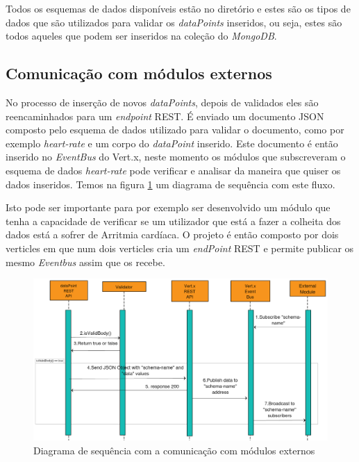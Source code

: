 Todos os esquemas de dados disponíveis estão no diretório \cite{schemas-available} e estes são os tipos de dados que são utilizados para validar os  \textit{dataPoints} inseridos, ou seja, estes são todos aqueles que podem ser inseridos na coleção do  \textit{MongoDB}.

\subsection{Comunicação com módulos externos}
No processo de inserção de novos \textit{dataPoints}, depois de validados eles são reencaminhados para um \textit{endpoint} \gls{REST}. É enviado um documento \gls{JSON} composto pelo esquema de dados utilizado para validar o documento, como por exemplo \textit{heart-rate} e um corpo do \textit{dataPoint} inserido. Este documento é então inserido no \textit{EventBus} do Vert.x, neste momento os módulos que subscreveram o esquema de dados \textit{heart-rate} pode verificar e analisar da maneira que quiser os dados inseridos. Temos na figura \ref{f:toExtSeqDiagram} um diagrama de sequência com este fluxo. \par
Isto pode ser importante para por exemplo ser desenvolvido um módulo que tenha a capacidade de verificar se um utilizador que está a fazer a colheita dos dados está a sofrer de Arritmia cardíaca.
O projeto é então composto por dois verticles em que num dois verticles cria um \textit{endPoint} \gls{REST} e permite publicar os mesmo \textit{Eventbus} assim que os recebe.

\begin{figure}[H]
  \centering
  \includegraphics[width=1\textwidth]{imgs/toExtSeqDiagram.png}
  \caption[Diagrama de sequência com a comunicação com módulos externos]{Diagrama de sequência com a comunicação com módulos externos}
  
  \label{f:toExtSeqDiagram}
\end{figure}

